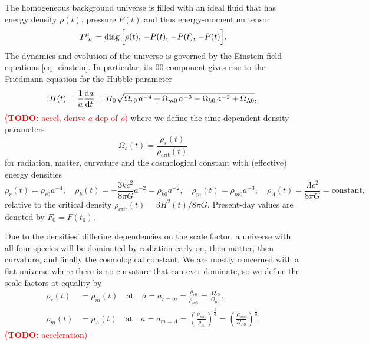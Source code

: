 \documentclass[10pt,a4paper]{article}
\newcommand\TODO[1]{\textcolor{red}{(\textbf{TODO:} #1)}}
\DeclareMathOperator{\diag}{diag}
\begin{document}
The homogeneous background universe is filled with an ideal fluid that has
energy density $\rho(t)$, pressure $P(t)$ and thus energy-momentum tensor
\begin{equation}
	T\indices{^\mu_\nu} = \diag\Big[\rho(t),\, -P(t),\, -P(t),\, -P(t)\Big].
\label{eq_energy_momentum_homogeneous}
\end{equation}
The dynamics and evolution of the universe is governed by the Einstein field equations \eqref{eq_einstein}.
In particular, its $00$-component gives rise to the Friedmann equation for the Hubble parameter
\begin{equation}
	H(t) = \frac{1}{a} \odv{a}{t} = H_0 \sqrt{\Omega_{r0} \, a^{-4} + \Omega_{m0} \, a^{-3} + \Omega_{k0} \, a^{-2} + \Omega_{\Lambda0}},
\label{eq_friedmann}
\end{equation}
\TODO{accel, derive $a$-dep of $\rho$}
where we define the time-dependent density parameters
\begin{equation}
	\Omega_s(t) = \frac{\rho_s(t)}{\rho_\text{crit}(t)}
\label{eq_density_parameters}
\end{equation}
for radiation, matter, curvature and the cosmological constant
with (effective) energy densities
\begin{equation}
	\rho_r(t) = \rho_{r0} a^{-4}, \quad
	\rho_k(t) = -\frac{3kc^2}{8 \pi G} a^{-2} = \rho_{k0} a^{-2}, \quad
	\rho_m(t) = \rho_{m0} a^{-3}, \quad
	\rho_\Lambda(t) = \frac{\Lambda c^2}{8 \pi G} = \text{constant},
\end{equation}
relative to the critical density
$\rho_\text{crit}(t) = 3H^2(t)/8\pi G$.
Present-day values are denoted by $F_0=F(t_0)$.

Due to the densities' differing dependencies on the scale factor,
a universe with all four species will be dominated by radiation early on, then matter, then curvature, and finally the cosmological constant.
We are mostly concerned with a flat universe where there is no curvature that can ever dominate,
so we define the scale factors at equality by
\begin{subequations}
\begin{align}
	\rho_r(t) &= \rho_m(t)       \quad \text{at} \quad a = a_{r=m} = \frac{\rho_{r0}}{\rho_{m0}} = \frac{\Omega_{r0}}{\Omega_{m0}}, \\
	\rho_m(t) &= \rho_\Lambda(t) \quad \text{at} \quad a = a_{m=\Lambda} = \left(\frac{\rho_{m0}}{\rho_{\Lambda}}\right)^\frac13 = \left(\frac{\Omega_{m0}}{\Omega_{\Lambda0}}\right)^\frac13.
\end{align}
\label{eq_equality_times}
\end{subequations}
\TODO{acceleration}
\end{document}
